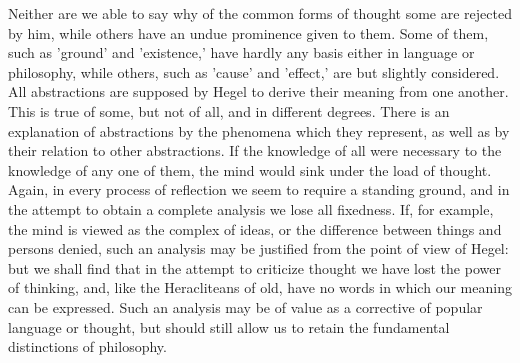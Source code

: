 \documentclass[11pt,letter]{article}
\begin{document}
\par  Neither are we able to say why of the common forms of thought some are rejected by him, while others have an undue prominence given to them. Some of them, such as 'ground' and 'existence,' have hardly any basis either in language or philosophy, while others, such as 'cause' and 'effect,' are but slightly considered. All abstractions are supposed by Hegel to derive their meaning from one another. This is true of some, but not of all, and in different degrees. There is an explanation of abstractions by the phenomena which they represent, as well as by their relation to other abstractions. If the knowledge of all were necessary to the knowledge of any one of them, the mind would sink under the load of thought. Again, in every process of reflection we seem to require a standing ground, and in the attempt to obtain a complete analysis we lose all fixedness. If, for example, the mind is viewed as the complex of ideas, or the difference between things and persons denied, such an analysis may be justified from the point of view of Hegel: but we shall find that in the attempt to criticize thought we have lost the power of thinking, and, like the Heracliteans of old, have no words in which our meaning can be expressed. Such an analysis may be of value as a corrective of popular language or thought, but should still allow us to retain the fundamental distinctions of philosophy.
\end{document}
